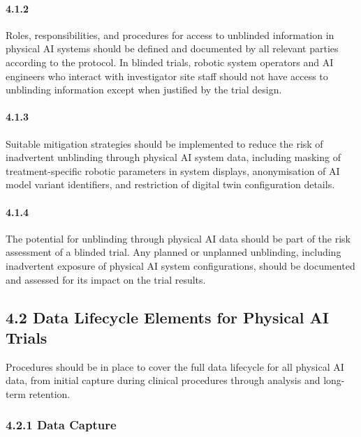 \documentclass[11pt]{article}
\begin{document}
\paragraph{4.1.2} Roles, responsibilities, and procedures for access to unblinded information in physical AI systems should be defined and documented by all relevant parties according to the protocol. In blinded trials, robotic system operators and AI engineers who interact with investigator site staff should not have access to unblinding information except when justified by the trial design.

\paragraph{4.1.3} Suitable mitigation strategies should be implemented to reduce the risk of inadvertent unblinding through physical AI system data, including masking of treatment-specific robotic parameters in system displays, anonymisation of AI model variant identifiers, and restriction of digital twin configuration details.

\paragraph{4.1.4} The potential for unblinding through physical AI data should be part of the risk assessment of a blinded trial. Any planned or unplanned unblinding, including inadvertent exposure of physical AI system configurations, should be documented and assessed for its impact on the trial results.

\subsection{4.2 Data Lifecycle Elements for Physical AI Trials}

Procedures should be in place to cover the full data lifecycle for all physical AI data, from initial capture during clinical procedures through analysis and long-term retention.

\subsubsection{4.2.1 Data Capture}
\end{document}
